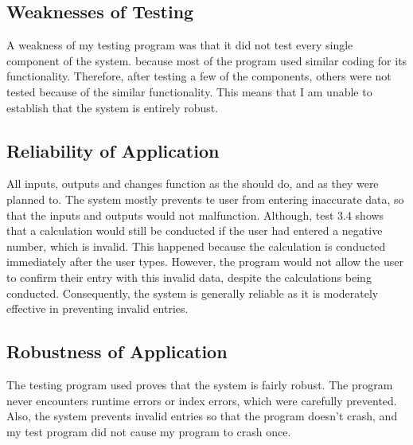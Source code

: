 \subsection{Weaknesses of Testing}

A weakness of my testing program was that it did not test every single component of the system. because most of the program used similar coding for its functionality. Therefore, after testing a few of the components, others were not tested because of the similar functionality. This means that I am unable to establish that the system is entirely robust.

\subsection{Reliability of Application}

All inputs, outputs and changes function as the should do, and as they were planned to. The system mostly prevents te user from entering inaccurate data, so that the inputs and outputs would not malfunction. Although, test 3.4 shows that a calculation would still be conducted if the user had entered a negative number, which is invalid. This happened because the calculation is conducted immediately after the user types. However, the program would not allow the user to confirm their entry with this invalid data, despite the calculations being conducted. Consequently, the system is generally reliable as it is moderately effective in preventing invalid entries.

\subsection{Robustness of Application}

The testing program used proves that the system is fairly robust. The program never encounters runtime errors or index errors, which were carefully prevented. Also, the system prevents invalid entries so that the program doesn't crash, and my test program did not cause my program to crash once.